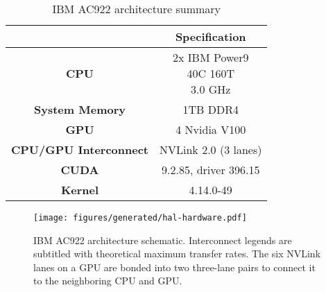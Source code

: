 \begin{table}[ht]
    \centering
    \caption[IBM AC922 architecture summary]{IBM AC922 architecture summary}
    \label{tab:ac922}
    \begin{tabular}{cc}
    \hline
    \textbf{}                      & \textbf{Specification}                           \\ \hline
    \textbf{CPU}                   & \makecell{2x IBM Power9 \\ 40C 160T \\ 3.0 GHz } \\ \hline
    \textbf{System Memory}         & 1TB DDR4                                         \\ \hline
	\textbf{GPU}                   & 4 Nvidia V100                                    \\ \hline
	\textbf{CPU/GPU Interconnect}  & NVLink 2.0 (3 lanes)                             \\ \hline
	\textbf{CUDA}                  & 9.2.85, driver 396.15                            \\ \hline
	\textbf{Kernel}                & 4.14.0-49                                        \\ \hline
    \end{tabular}
\end{table}

\begin{figure}
    \centering
	\texttt{[image: figures/generated/hal-hardware.pdf]}
    \caption[IBM AC922 architecture schematic]{
		IBM AC922 architecture schematic.
		Interconnect legends are subtitled with theoretical maximum transfer rates.
		The six NVLink lanes on a GPU are bonded into two three-lane pairs to connect it to the neighboring CPU and GPU.
	}
    \label{fig:topo-ac922-simple}
\end{figure}
